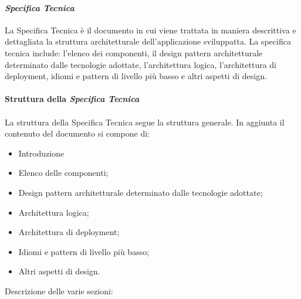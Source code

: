 \paragraph{\textit{Specifica Tecnica}}
La Specifica Tecnica è il documento in cui viene trattata in maniera descrittiva e dettagliata la struttura architetturale dell'applicazione sviluppatta. 
La specifica tecnica include: l'elenco dei componenti, il design pattern architetturale determinato dalle tecnologie adottate, l'architettura logica, l'architettura di deployment, idiomi e pattern di livello più basso e altri aspetti di design.
\\\\
\textbf{Struttura della \textit{Specifica Tecnica}}
\\\\
La struttura della Specifica Tecnica segue la struttura generale.
In aggiunta il contenuto del documento si compone di:
\begin{itemize}
	\item Introduzione
    \item Elenco delle componenti;
    \item Design pattern architetturale determinato dalle tecnologie adottate;
    \item Architettura logica;
	\item Architettura di deployment;
	\item Idiomi e pattern di livello più basso;
	\item Altri aspetti di design.
\end{itemize}
\noindent Descrizione delle varie sezioni:
